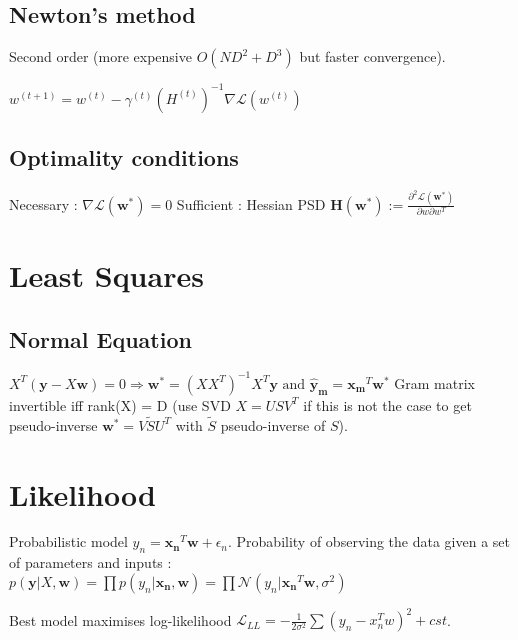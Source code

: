 \subsection{Newton's method}
Second order (more expensive $O(ND^2 + D^3)$ but faster convergence).

$w^{(t+1)} = w^{(t)} - \gamma^{(t)} (H^{(t)})^{-1} \nabla \mathcal{L}(w^{(t)})$


\subsection{Optimality conditions}
Necessary : $\nabla \mathcal{L} (\mathbf{w}^*) = 0$
Sufficient : Hessian PSD $\mathbf{H}(\mathbf{w}^*) := \frac{\partial^2 \mathcal{L}(\mathbf{w}^*)}{\partial w \partial w^T}$


\section{Least Squares}
\subsection{Normal Equation}
$X^T (\mathbf{y} - X\mathbf{w})= 0 \Rightarrow \mathbf{w^*} = (XX^T)^{-1}X^T\mathbf{y} \text{ and } \mathbf{\hat{y}_m} = \mathbf{x_m}^T \mathbf{w^*}$
Gram matrix invertible iff rank(X) = D (use SVD $X = USV^T$ if this is not the case to get pseudo-inverse $\mathbf{w^*} = V\tilde{S}U^T$ with $\tilde{S}$ pseudo-inverse of $S$).

\section{Likelihood}
Probabilistic model $y_n = \mathbf{x_n}^T\mathbf{w} + \epsilon_n$.
Probability of observing the data given a set of parameters and inputs :
$p(\mathbf{y}|X, \mathbf{w}) = \prod p(y_n|\mathbf{x_n}, \mathbf{w})  = \prod \mathcal{N} (y_n | \mathbf{x_n}^T\mathbf{w}, \sigma^2)$

Best model maximises log-likelihood $\mathcal{L}_{LL} = -\frac{1}{2\sigma^2} \sum(y_n-x_n^Tw)^2+cst$.



